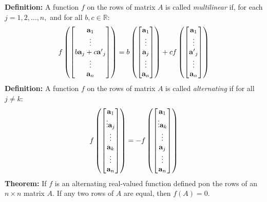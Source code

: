 \documentclass{article}
\begin{document}
    \begin{minipage}[t]{0.45\linewidth}
        \textbf{Definition:} A function $f$ on the rows of matrix $A$ is called \textit{multilinear} if, for each $j=1,2,\dots,n,$ and for all $b,c\in \mathbb{R}$:
        \begin{equation*}
            f\left(\begin{bmatrix}
                \mathbf{a}_1 \\ \vdots \\ b\mathbf{a}_j + c\mathbf{a'}_j \\ \vdots \\ \mathbf{a}_n
            \end{bmatrix}\right)=b\left(\begin{bmatrix}
                \mathbf{a}_1 \\ \vdots \\ \mathbf{a}_j \\ \vdots \\ \mathbf{a}_n
            \end{bmatrix}\right)+cf\left(\begin{bmatrix}
                \mathbf{a}_1 \\ \vdots \\ \mathbf{a'}_j \\ \vdots \\ \mathbf{a}_n
            \end{bmatrix}\right)
        \end{equation*}
        \textbf{Definition:} A function $f$ on the rows of matrix $A$ is called \textit{alternating} if for all $j \neq k$:
        \begin{equation*}
            f\left(\begin{bmatrix}
                \mathbf{a}_1 \\ \vdots \mathbf{a}_j \\ \vdots \\ \mathbf{a}_k \\ \vdots \\ \mathbf{a}_n
            \end{bmatrix}\right) = -f\left(\begin{bmatrix}
                \mathbf{a}_1 \\ \vdots \mathbf{a}_k \\ \vdots \\ \mathbf{a}_j \\ \vdots \\ \mathbf{a}_n
            \end{bmatrix}\right)
        \end{equation*}
        \textbf{Theorem:} If $f$ is an alternating real-valued function defined pon the rows of an $n\times n$ matrix $A$. If any two rows of $A$ are equal, then $f(A)=0$.
        \vspace{2mm}


\end{minipage}
\end{document}
